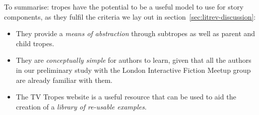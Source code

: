 \documentclass[11pt]{report}
\def\tropical{TropICAL}
\begin{document}
To summarise: tropes have the potential to be a useful model to use for story
components, as they fulfil the criteria we lay out in
section~\ref{sec:litrev-discussion}:

\begin{itemize}
\item They provide a \emph{means of abstraction} through subtropes as well as parent and child
  tropes.
\item They are \emph{conceptually simple} for authors to learn, given that
all the authors in our preliminary study with the London Interactive Fiction
Meetup group are already familiar with them.
\item The TV Tropes website is a useful resource that can be used to aid the
  creation of a \emph{library of re-usable examples}.
\end{itemize}





\end{document}
